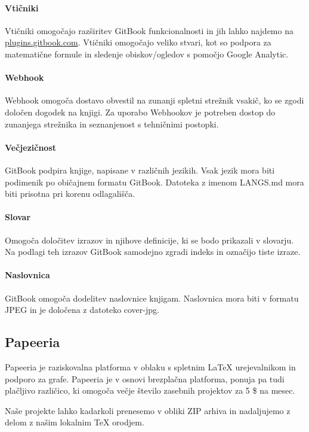\documentclass[a4paper, 12pt]{book}
\begin{document}
\paragraph{Vtičniki}
Vtičniki omogočajo razširitev GitBook funkcionalnosti in jih lahko najdemo na \url{plugins.gitbook.com}. Vtičniki omogočajo veliko stvari, kot so podpora za matematične formule in sledenje obiskov/ogledov s pomočjo Google Analytic.

\paragraph{Webhook}
Webhook omogoča dostavo obvestil na zunanji spletni strežnik vsakič, ko se zgodi določen dogodek na knjigi. Za uporabo Webhookov je potreben dostop do zunanjega strežnika in seznanjenost s tehničnimi postopki.

\paragraph{Večjezičnost}
GitBook podpira knjige, napisane v različnih jezikih. Vsak jezik mora biti podimenik po običajnem formatu GitBook. Datoteka z imenom LANGS.md mora biti prisotna pri korenu odlagališča.

\paragraph{Slovar}
Omogoča določitev izrazov in njihove definicije, ki se bodo prikazali v slovarju. Na podlagi teh izrazov GitBook samodejno zgradi indeks in označijo tiste izraze. 

\paragraph{Naslovnica}
GitBook omogoča dodelitev naslovnice knjigam. Naslovnica mora biti v formatu JPEG in je določena z datoteko cover-jpg.

\subsection{Papeeria}
Papeeria je raziskovalna platforma v oblaku s spletnim {\LaTeX} urejevalnikom in podporo za grafe. Papeeria je v osnovi brezplačna platforma, ponuja pa tudi plačljivo različico, ki omogoča večje število zasebnih projektov za 5 \$ na mesec.

Naše projekte lahko kadarkoli prenesemo v obliki ZIP arhiva in nadaljujemo z delom z našim lokalnim TeX orodjem. 
\end{document}
